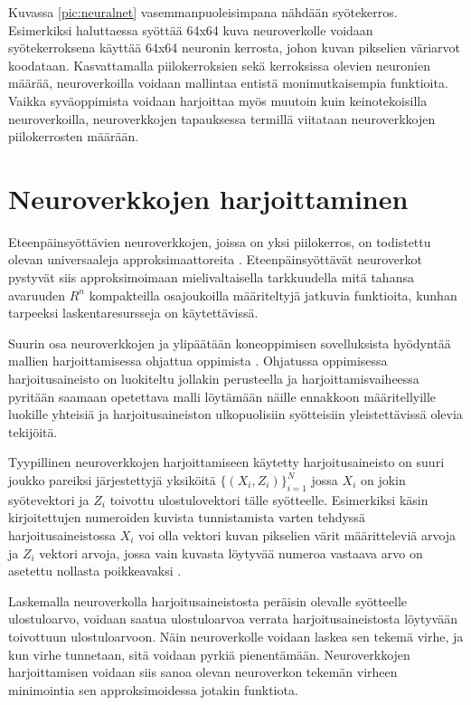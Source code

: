 \documentclass[finnish]{tktltiki2}
\theoremstyle{definition}
\theoremstyle{remark}
\begin{document}
  Kuvassa \ref{pic:neuralnet} vasemmanpuoleisimpana nähdään syötekerros. Esimerkiksi haluttaessa syöttää 64x64 kuva neuroverkolle voidaan syötekerroksena käyttää 64x64 neuronin kerrosta, johon kuvan pikselien väriarvot koodataan.
  Kasvattamalla piilokerroksien sekä kerroksissa olevien neuronien määrää, neuroverkoilla voidaan mallintaa entistä monimutkaisempia funktioita. Vaikka syväoppimista voidaan harjoittaa myös muutoin kuin keinotekoisilla neuroverkoilla, neuroverkkojen tapauksessa termillä viitataan neuroverkkojen piilokerrosten määrään. 

  \section{Neuroverkkojen harjoittaminen}
    \label{chap:neural-training}

  Eteenpäinsyöttävien neuroverkkojen, joissa on yksi piilokerros, on todistettu olevan universaaleja approksimaattoreita \cite{multilayer-feedforward-universal-approximators}. Eteenpäinsyöttävät neuroverkot pystyvät siis approksimoimaan mielivaltaisella tarkkuudella mitä tahansa avaruuden $R^n$ kompakteilla osajoukoilla määriteltyjä jatkuvia funktioita, kunhan tarpeeksi laskentaresursseja on käytettävissä.
  

  Suurin osa neuroverkkojen ja ylipäätään koneoppimisen sovelluksista hyödyntää mallien harjoittamisessa ohjattua oppimista \cite{nature-lecun15}. Ohjatussa oppimisessa harjoitusaineisto on luokiteltu jollakin perusteella ja harjoittamisvaiheessa pyritään saamaan opetettava malli löytämään näille ennakkoon määritellyille luokille yhteisiä ja harjoitusaineiston ulkopuolisiin syötteisiin yleistettävissä olevia tekijöitä. 
  
  Tyypillinen neuroverkkojen harjoittamiseen käytetty harjoitusaineisto on suuri joukko pareiksi järjestettyjä yksiköitä $ \{(X_i, Z_i)\}_{i=1}^N $ jossa $X_i$ on jokin syötevektori ja $Z_i$ toivottu ulostulovektori tälle syötteelle. Esimerkiksi käsin kirjoitettujen numeroiden kuvista tunnistamista varten tehdyssä harjoitusaineistossa $X_i$ voi olla vektori kuvan pikselien värit määritteleviä arvoja ja $Z_i$ vektori arvoja, jossa vain kuvasta löytyvää numeroa vastaava arvo on asetettu nollasta poikkeavaksi \cite{Nielsen-neural}.

  Laskemalla neuroverkolla harjoitusaineistosta peräisin olevalle syötteelle ulostuloarvo, voidaan saatua ulostuloarvoa verrata harjoitusaineistosta löytyvään toivottuun ulostuloarvoon. Näin neuroverkolle voidaan laskea sen tekemä virhe, ja kun virhe tunnetaan, sitä voidaan pyrkiä pienentämään. 
  Neuroverkkojen harjoittamisen voidaan siis sanoa olevan neuroverkon tekemän virheen minimointia sen approksimoidessa jotakin funktiota.
  
\end{document}
